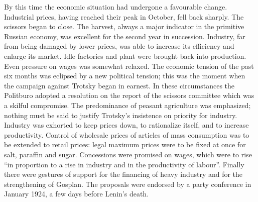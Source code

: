 By this time the economic situation had undergone a favourable change. Industrial prices, having reached their peak in October, fell back sharply. The scissors began to close. The harvest, always a major indicator in the primitive Russian economy, was excellent for the second year in succession. Industry, far from being damaged by lower prices, was able to increase its efficiency and enlarge its market. Idle factories and plant were brought back into production. Even pressure on wages was somewhat relaxed. The economic tension of the past six months was eclipsed by a new political tension; this was the moment when the campaign against Trotsky began in earnest. In these circumstances the Politburo adopted a resolution on the report of the scissors committee which was a skilful compromise. The predominance of peasant agriculture was emphasized; nothing must be said to justify Trotsky's insistence on priority for industry. Industry was exhorted to keep prices down, to rationalize itself, and to increase productivity. Control of wholesale prices of articles of mass consumption was to be extended to retail prices: legal maximum prices were to be fixed at once for salt, paraffin and sugar. Concessions were promised on wages, which were to rise ``in proportion to a rise in industry and in the productivity of labour''. Finally there were gestures of support for the financing of heavy industry and for the strengthening of Gosplan. The proposals were endorsed by a party conference in January 1924, a few days before Lenin's death. 


